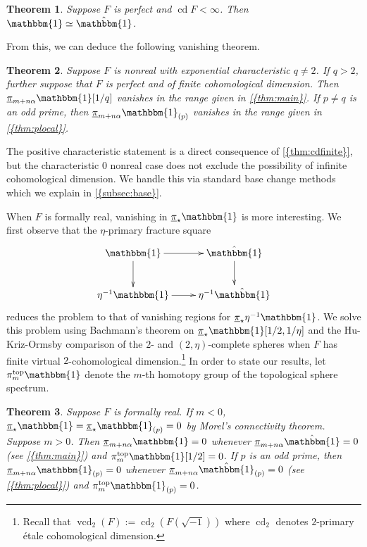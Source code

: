\documentclass[10pt]{amsart}
\numberwithin{equation}{section}
\theoremstyle{plain}
\newtheorem{theorem}[theorem]{Theorem}
\theoremstyle{definition}
\theoremstyle{remark}
\begin{document}
\begin{theorem}\label{thm:cdfinite}
Suppose $F$ is perfect and ${\operatorname{cd}} F <\infty$.  Then ${\mathbbm{1}}\simeq \hat{\mathbbm{1}}$.\hfill\qedsymbol
\end{theorem}

From this, we can deduce the following vanishing theorem.

\begin{theorem}\label{thm:integral0}
Suppose $F$ is nonreal with exponential characteristic $q\ne 2$.  If $q>2$, further suppose that $F$ is perfect and of finite cohomological dimension.  Then ${\underline{\smash{\pi}}}_{m+n\alpha}{\mathbbm{1}}[1/q]$ vanishes in the range given in {\autoref{{thm:main}}}.  If $p\ne q$ is an odd prime, then ${\underline{\smash{\pi}}}_{m+n\alpha}{\mathbbm{1}}_{(p)}$ vanishes in the range given in {\autoref{{thm:plocal}}}.
\end{theorem}

The positive characteristic statement is a direct consequence of {\autoref{{thm:cdfinite}}}, but the characteristic $0$ nonreal case does not exclude the possibility of infinite cohomological dimension.  We handle this via standard base change methods which we explain in {\autoref{{subsec:base}}}.

When $F$ is formally real, vanishing in ${\underline{\smash{\pi}}}_\star{\mathbbm{1}}$ is more interesting.  We first observe that the $\eta$-primary fracture square
\[\xymatrix{
  {\mathbbm{1}}\ar[r]\ar[d] &\hat{\mathbbm{1}}\ar[d]\\
  \eta^{-1}{\mathbbm{1}}\ar[r] &\eta^{-1}\hat{\mathbbm{1}}
}\]
reduces the problem to that of vanishing regions for ${\underline{\smash{\pi}}}_\star \eta^{-1}{\mathbbm{1}}$.  We solve this problem using Bachmann's theorem on ${\underline{\smash{\pi}}}_\star {\mathbbm{1}}[1/2,1/\eta]$ and the Hu-Kriz-Ormsby comparison of the $2$- and $(2,\eta)$-complete spheres when $F$ has finite virtual $2$-cohomological dimension.\footnote{Recall that ${\operatorname{vcd}}_2(F):={\operatorname{cd}}_2(F(\sqrt{-1}))$ where ${\operatorname{cd}}_2$ denotes $2$-primary \'etale cohomological dimension.}  In order to state our results, let $\pi_m^{{\mathrm{top}}} {\mathbbm{1}}$ denote the $m$-th homotopy group of the topological sphere spectrum.

\begin{theorem}\label{thm:integral1}
Suppose $F$ is formally real.  If $m<0$, ${\underline{\smash{\pi}}}_\star {\mathbbm{1}}={\underline{\smash{\pi}}}_\star{\mathbbm{1}}_{(p)} = 0$ by Morel's connectivity theorem.  Suppose $m>0$.  Then ${\underline{\smash{\pi}}}_{m+n\alpha}{\mathbbm{1}} = 0$ whenever ${\underline{\smash{\pi}}}_{m+n\alpha}\hat {\mathbbm{1}} = 0$ (see {\autoref{{thm:main}}}) and $\pi_m^{{\mathrm{top}}} {\mathbbm{1}}[1/2] = 0$.  If $p$ is an odd prime, then ${\underline{\smash{\pi}}}_{m+n\alpha}{\mathbbm{1}}_{(p)} = 0$ whenever ${\underline{\smash{\pi}}}_{m+n\alpha}\hat {\mathbbm{1}}_{(p)} = 0$ (see {\autoref{{thm:plocal}}}) and $\pi_m^{{\mathrm{top}}} {\mathbbm{1}}_{(p)} = 0$.
\end{theorem}
\end{document}
